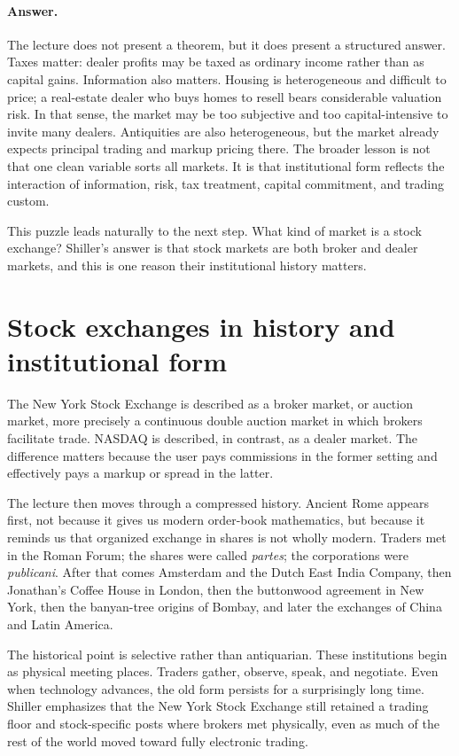 \paragraph{Answer.} The lecture does not present a theorem, but it does present a structured answer. Taxes matter: dealer profits may be taxed as ordinary income rather than as capital gains. Information also matters. Housing is heterogeneous and difficult to price; a real-estate dealer who buys homes to resell bears considerable valuation risk. In that sense, the market may be too subjective and too capital-intensive to invite many dealers. Antiquities are also heterogeneous, but the market already expects principal trading and markup pricing there. The broader lesson is not that one clean variable sorts all markets. It is that institutional form reflects the interaction of information, risk, tax treatment, capital commitment, and trading custom.

This puzzle leads naturally to the next step. What kind of market is a stock exchange? Shiller's answer is that stock markets are both broker and dealer markets, and this is one reason their institutional history matters.

\section{Stock exchanges in history and institutional form}

The New York Stock Exchange is described as a broker market, or auction market, more precisely a continuous double auction market in which brokers facilitate trade. NASDAQ is described, in contrast, as a dealer market. The difference matters because the user pays commissions in the former setting and effectively pays a markup or spread in the latter.

The lecture then moves through a compressed history. Ancient Rome appears first, not because it gives us modern order-book mathematics, but because it reminds us that organized exchange in shares is not wholly modern. Traders met in the Roman Forum; the shares were called \emph{partes}; the corporations were \emph{publicani}. After that comes Amsterdam and the Dutch East India Company, then Jonathan's Coffee House in London, then the buttonwood agreement in New York, then the banyan-tree origins of Bombay, and later the exchanges of China and Latin America.

The historical point is selective rather than antiquarian. These institutions begin as physical meeting places. Traders gather, observe, speak, and negotiate. Even when technology advances, the old form persists for a surprisingly long time. Shiller emphasizes that the New York Stock Exchange still retained a trading floor and stock-specific posts where brokers met physically, even as much of the rest of the world moved toward fully electronic trading.

